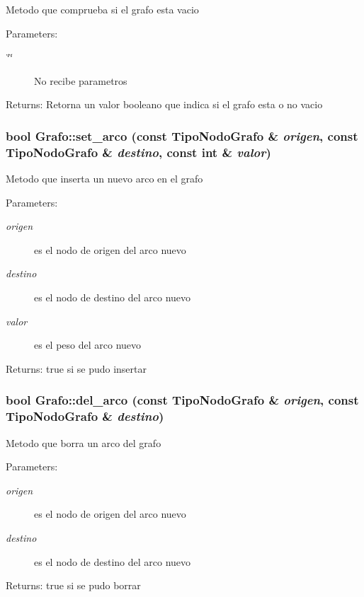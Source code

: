 Metodo que comprueba si el grafo esta vacio \begin{Desc}
\item[Parameters:]
\begin{description}
\item[{\em \char`\"{}\char`\"{}}]No recibe parametros \end{description}
\end{Desc}
\begin{Desc}
\item[Returns:]Retorna un valor booleano que indica si el grafo esta o no vacio \end{Desc}
\subsubsection{\setlength{\rightskip}{0pt plus 5cm}bool Grafo::set\_\-arco (const {\bf TipoNodoGrafo} \& {\em origen}, const {\bf TipoNodoGrafo} \& {\em destino}, const int \& {\em valor})}\label{classGrafo_5ff1c53f81913e5cdb13d6b1077c667f}


Metodo que inserta un nuevo arco en el grafo \begin{Desc}
\item[Parameters:]
\begin{description}
\item[{\em origen}]es el nodo de origen del arco nuevo \item[{\em destino}]es el nodo de destino del arco nuevo \item[{\em valor}]es el peso del arco nuevo \end{description}
\end{Desc}
\begin{Desc}
\item[Returns:]true si se pudo insertar \end{Desc}
\subsubsection{\setlength{\rightskip}{0pt plus 5cm}bool Grafo::del\_\-arco (const {\bf TipoNodoGrafo} \& {\em origen}, const {\bf TipoNodoGrafo} \& {\em destino})}\label{classGrafo_202743d0396c9ccd66a16797a95a2a20}


Metodo que borra un arco del grafo \begin{Desc}
\item[Parameters:]
\begin{description}
\item[{\em origen}]es el nodo de origen del arco nuevo \item[{\em destino}]es el nodo de destino del arco nuevo \end{description}
\end{Desc}
\begin{Desc}
\item[Returns:]true si se pudo borrar \end{Desc}
